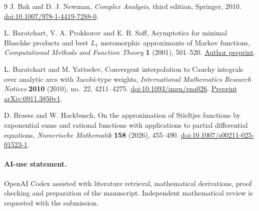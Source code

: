 \documentclass[11pt]{article}
\begin{document}
\clearpage
\begingroup
\small
\begin{thebibliography}{9}
\setlength{\itemsep}{2pt}
J. Bak and D. J. Newman,
\emph{Complex Analysis}, third edition, Springer, 2010.
\href{https://doi.org/10.1007/978-1-4419-7288-0}{doi:10.1007/978-1-4419-7288-0}.

L. Baratchart, V. A. Prokhorov and E. B. Saff,
Asymptotics for minimal Blaschke products and best $L_1$ meromorphic
approximants of Markov functions,
\emph{Computational Methods and Function Theory} \textbf{1} (2001), 501--520.
\href{https://math.vanderbilt.edu/saffeb/texts/193.pdf}{Author preprint}.

L. Baratchart and M. Yattselev,
Convergent interpolation to Cauchy integrals over analytic arcs with
Jacobi-type weights,
\emph{International Mathematics Research Notices} \textbf{2010} (2010),
no.~22, 4211--4275.
\href{https://doi.org/10.1093/imrn/rnq026}{doi:10.1093/imrn/rnq026}.
\href{https://arxiv.org/abs/0911.3850v1}{Preprint arXiv:0911.3850v1}.

D. Braess and W. Hackbusch,
On the approximation of Stieltjes functions by exponential sums and rational
functions with applications to partial differential equations,
\emph{Numerische Mathematik} \textbf{158} (2026), 455--490.
\href{https://doi.org/10.1007/s00211-025-01523-1}{doi:10.1007/s00211-025-01523-1}.
\end{thebibliography}
\endgroup

\paragraph*{AI-use statement.}
OpenAI Codex assisted with literature retrieval, mathematical derivations,
proof checking and preparation of the manuscript.
Independent mathematical review is requested with the submission.
\end{document}
